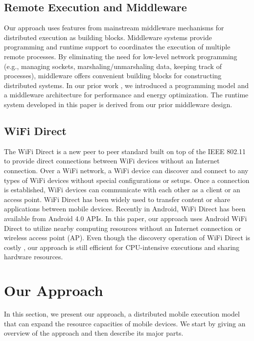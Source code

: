 \documentclass{sig-alternate}[10pt]
\begin{document}
\subsection{Remote Execution and Middleware}
Our approach uses features from mainstream middleware mechanisms for distributed execution as building blocks. Middleware systems provide programming and runtime support to coordinates the execution of multiple remote processes. By eliminating the need for low-level network programming (e.g., managing sockets, marshaling/unmarshaling data, keeping track of processes), middleware offers convenient building blocks for constructing distributed systems. In our prior work \cite{kwon+:mobilesoft2015}, we introduced a programming model and a middleware architecture for performance and energy optimization. The runtime system developed in this paper is derived from our prior middleware design.

\subsection{WiFi Direct}
The WiFi Direct \cite{alliance2010wi} is a new peer to peer standard built on top of the IEEE 802.11 to provide direct connections between WiFi devices without an Internet connection. Over a WiFi network, a WiFi device can discover and connect to any types of WiFi devices without special configurations or setups. Once a connection is established, WiFi devices can communicate with each other as a client or an access point. WiFi Direct has been widely used to transfer content or share applications between mobile devices. Recently in Android, WiFi Direct has been available from Android 4.0 APIs. In this paper, our approach uses Android WiFi Direct \cite{wifi:p2p} to utilize nearby computing resources without an Internet connection or wireless access point (AP). Even though the discovery operation of WiFi Direct is costly \cite{trifunovic2013slicing}, our approach is still efficient for CPU-intensive executions and sharing hardware resources. 

\section{Our Approach}
\label{sec:approach}
In this section, we present our approach, a distributed mobile execution model that can expand the resource capacities of mobile devices. We start by giving an overview of the approach and then describe its major parts.
\end{document}
